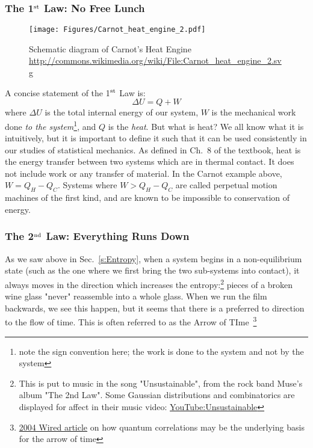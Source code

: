 \subsubsection{The 1$^{\rm st}$ Law: No Free Lunch}
\label{s:FirstLaw}
\begin{figure}[h]
\centering
\texttt{[image: Figures/Carnot\_heat\_engine\_2.pdf]}
\caption{Schematic diagram of Carnot's Heat Engine \\
	\url{http://commons.wikimedia.org/wiki/File:Carnot_heat_engine_2.svg}}
\end{figure}
A concise statement of the 1$^{\rm st}$ Law is:
\begin{equation}
\Delta U = Q + W
\label{eq:FirstLaw}
\end{equation}
where $\Delta U$ is the total internal energy of our system, $W$ is the
mechanical work done \emph{to the system}\footnote{note the sign convention
here; the work is done to the system and not by the system}, and $Q$ is
the \textit{heat}. But what is heat? We all know what it is intuitively,
but it is important to define it such that it can be used consistently in
our studies of statistical mechanics. As defined in Ch.~8 of the textbook,
heat is the energy transfer between two systems which are in thermal contact.
It does not include work or any transfer of material. In the Carnot example
above, $W = Q_H - Q_C$. Systems where $W > Q_H - Q_C$ are called
perpetual motion machines of the first kind, and are known to be
impossible to conservation of energy.

\subsubsection{The 2$^{\rm nd}$ Law: Everything Runs Down}
As we saw above in Sec.~\ref{s:Entropy}, when a system begins in a
non-equilibrium state (such as the one where we first bring the two
sub-systems into contact), it always moves in the direction which
increases the entropy:\footnote{This is put to music in the song "Unsustainable", from the rock band Muse's album "The 2nd Law". Some Gaussian distributions and combinatorics are displayed for affect in their music video:
\href{https://www.youtube.com/watch?v=EF_xdvn52As}{YouTube:Unsustainable}} pieces of a broken wine glass "never" reassemble
into a whole glass. When we run the film backwards, we see this happen,
but it seems that there is a preferred to direction to the 
flow of time. This is often referred to as the 
Arrow of TIme~\footnote{\href{http://www.wired.com/2014/04/quantum-theory-flow-time/}{2004 Wired article} on how quantum correlations may be the underlying basis for the arrow of time}

